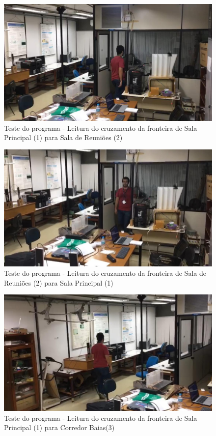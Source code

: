 \begin{figure}[H]
    \centering
    \includegraphics[width=0.5\linewidth]{figs/Resultados/cruzamento12.jpeg}
    \caption{Teste do programa - Leitura do cruzamento da fronteira de Sala Principal (1) para Sala de Reuniões (2)}
    \label{fig:cruzamento12}
\end{figure}

\begin{figure}[H]
    \centering
    \includegraphics[width=0.5\linewidth]{figs/Resultados/cruzamento21.jpeg}
    \caption{Teste do programa - Leitura do cruzamento da fronteira de Sala de Reuniões (2) para Sala Principal (1)}
    \label{fig:cruzamento21}
\end{figure}

\begin{figure}[H]
    \centering
    \includegraphics[width=0.5\linewidth]{figs/Resultados/cruzamento13.jpeg}
    \caption{Teste do programa - Leitura do cruzamento da fronteira de Sala Principal (1) para Corredor Baias(3)}
    \label{fig:cruzamento13}
\end{figure}

